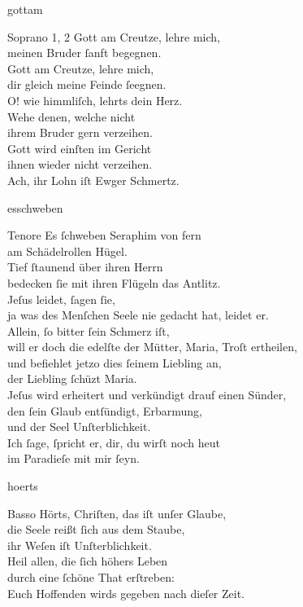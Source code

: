 \documentclass[shorttitlesize=55,tocstyle=ref-genre]{ees}
\begin{document}
{\begin{movement}{gottam}
  \item[Soprano 1, 2]
  Gott am Creutze, lehre mich,\\
  meinen Bruder ſanft begegnen.\\
  Gott am Creutze, lehre mich,\\
  dir gleich meine Feinde ſeegnen.\\
  O! wie himmliſch, lehrts dein Herz.\\
  Wehe denen, welche nicht\\
  ihrem Bruder gern verzeihen.\\
  Gott wird einſten im Gericht\\
  ihnen wieder nicht verzeihen.\\
  Ach, ihr Lohn iſt Ewger Schmertz.
\end{movement}

\begin{movement}{esschweben}
  \item[Tenore]
  Es ſchweben Seraphim von fern\\
  am Schädelrollen Hügel.\\
  Tief ſtaunend über ihren Herrn\\
  bedecken ſie mit ihren Flügeln das Antlitz.\\
  Jeſus leidet, ſagen ſie,\\
  ja was des Menſchen Seele nie gedacht hat, leidet er.\\
  Allein, ſo bitter ſein Schmerz iſt,\\
  will er doch die edelſte der Mütter, Maria, Troſt ertheilen,\\
  und befiehlet jetzo dies ſeinem Liebling an,\\
  der Liebling ſchüzt Maria.\\
  Jeſus wird erheitert und verkündigt drauf einen Sünder,\\
  den ſein Glaub entſündigt, Erbarmung,\\
  und der Seel Unſterblichkeit.\\
  Ich ſage, ſpricht er, dir, du wirſt noch heut\\
  im Paradieſe mit mir ſeyn.
\end{movement}

\begin{movement}{hoerts}
  \item[Basso]
  Hörts, Chriſten, das iſt unſer Glaube,\\
  die Seele reißt ſich aus dem Staube,\\
  ihr Weſen iſt Unſterblichkeit.\\
  Heil allen, die ſich höhers Leben\\
  durch eine ſchöne That erſtreben:\\
  Euch Hoffenden wirds gegeben nach dieſer Zeit.
\end{movement}

}
\end{document}
